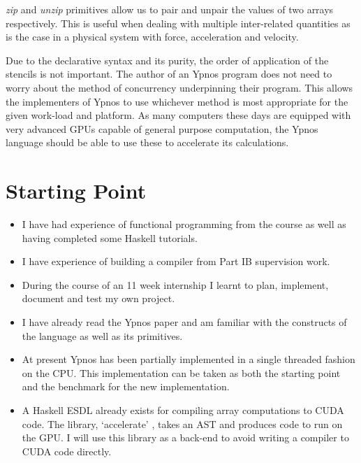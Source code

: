 \emph{zip} and \emph{unzip} primitives allow us to pair and unpair the values
of two arrays respectively. This is useful when dealing with multiple
inter-related quantities as is the case in a physical system with force,
acceleration and velocity.

Due to the declarative syntax and its purity, the order of application of the
stencils is not important. The author of an Ypnos program does not need to
worry about the method of concurrency underpinning their program. This allows
the implementers of Ypnos to use whichever method is most appropriate for the
given work-load and platform. As many computers these days are equipped with
very advanced GPUs capable of general purpose computation, the Ypnos language
should be able to use these to accelerate its calculations.

\section*{Starting Point}

\begin{itemize}

\item I have had experience of functional programming from the course as well
as having completed some Haskell tutorials.

\item I have experience of building a compiler from Part IB supervision work.

\item During the course of an 11 week internship I learnt to plan, implement,
document and test my own project.

\item I have already read the Ypnos paper and am familiar with the constructs
of the language as well as its primitives.

\item At present Ypnos has been partially implemented in a single threaded
fashion on the CPU. This implementation can be taken as both the starting point
and the benchmark for the new implementation.

\item A Haskell ESDL already exists for compiling array computations to CUDA
code. The library, `accelerate' \cite{acc-damp11}, takes an AST and produces code
to run on the GPU.  I will use this library as a back-end to avoid writing a
compiler to CUDA code directly.

\end{itemize}

